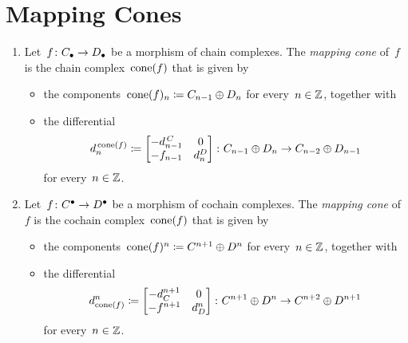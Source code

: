 \section{Mapping Cones}


\begin{definition}
  \leavevmode
  \begin{enumerate}
    \item
      Let~$f \colon C_\bullet \to D_\bullet$ be a morphism of chain complexes.
      The \emph{mapping cone} of~$f$ is the chain complex~$\operatorname{cone}(f)$ that is given by
      \begin{itemize}
        \item
          the components~$\operatorname{cone}(f)_n \coloneqq C_{n-1} \oplus D_n$ for every~$n \in \mathbb{Z}$, together with
        \item
          the differential
          \[
                      d^{\,\operatorname{cone}(f)}_n
            \coloneqq  \begin{bmatrix}
                        -d^{\,C}_{n-1}  & 0     \\
                        -f_{n-1}    & d^D_n
                      \end{bmatrix}
            \colon    C_{n-1} \oplus D_n
            \to       C_{n-2} \oplus D_{n-1}
          \]
          for every~$n \in \mathbb{Z}$.
      \end{itemize}
    \item
      Let~$f \colon C^\bullet \to D^\bullet$ be a morphism of cochain complexes.
      The \emph{mapping cone} of~$f$ is the cochain complex~$\operatorname{cone}(f)$ that is given by
      \begin{itemize}
        \item
          the components~$\operatorname{cone}(f)^n \coloneqq C^{n+1} \oplus D^n$ for every~$n \in \mathbb{Z}$, together with
        \item
          the differential
          \[
                      d_{\operatorname{cone}(f)}^n
            \coloneqq  \begin{bmatrix}
                        -d_C^{n+1}  & 0     \\
                        -f^{n+1}    & d_D^n
                      \end{bmatrix}
            \colon    C^{n+1} \oplus D^n
            \to       C^{n+2} \oplus D^{n+1}
          \]
          for every~$n \in \mathbb{Z}$.
      \end{itemize}
  \end{enumerate}
\end{definition}


